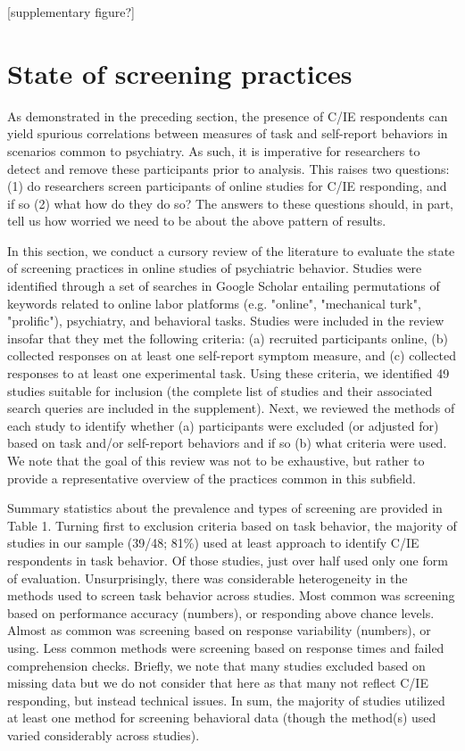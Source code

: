 \documentclass[a4paper,notitlepage,12pt]{article}
\begin{document}
[supplementary figure?]

\section{State of screening practices}

As demonstrated in the preceding section, the presence of C/IE respondents can yield spurious correlations between measures of task and self-report behaviors in scenarios common to psychiatry. As such, it is imperative for researchers to detect and remove these participants prior to analysis. This raises two questions: (1) do researchers screen participants of online studies for C/IE responding, and if so (2) what how do they do so? The answers to these questions should, in part, tell us how worried we need to be about the above pattern of results.

In this section, we conduct a cursory review of the literature to evaluate the state of screening practices in online studies of psychiatric behavior. Studies were identified through a set of searches in Google Scholar entailing permutations of keywords related to online labor platforms (e.g. "online", "mechanical turk", "prolific"), psychiatry, and behavioral tasks. Studies were included in the review insofar that they met the following criteria: (a) recruited participants online, (b) collected responses on at least one self-report symptom measure, and (c) collected responses to at least one experimental task. Using these criteria, we identified 49 studies suitable for inclusion (the complete list of studies and their associated search queries are included in the supplement). Next, we reviewed the methods of each study to identify whether (a) participants were excluded (or adjusted for) based on task and/or self-report behaviors and if so (b) what criteria were used. We note that the goal of this review was not to be exhaustive, but rather to provide a representative overview of the practices common in this subfield.

Summary statistics about the prevalence and types of screening are provided in Table 1. Turning first to exclusion criteria based on task behavior, the majority of studies in our sample (39/48; 81\%) used at least approach to identify C/IE respondents in task behavior. Of those studies, just over half used only one form of evaluation. Unsurprisingly, there was considerable heterogeneity in the methods used to screen task behavior across studies. Most common was screening based on performance accuracy (numbers), or responding above chance levels. Almost as common was screening based on response variability (numbers), or using. Less common methods were screening based on response times and failed comprehension checks. Briefly, we note that many studies excluded based on missing data but we do not consider that here as that many not reflect C/IE responding, but instead technical issues. In sum, the majority of studies utilized at least one method for screening behavioral data (though the method(s) used varied considerably across studies). 
\end{document}
